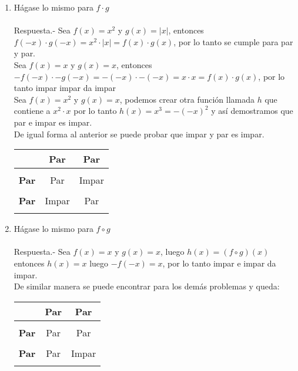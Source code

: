 \begin{enumerate}
\begin{enumerate}[\bfseries (a)]
	    \item Hágase lo mismo para $f\cdot g$\\\\
	    Respuesta.-\; Sea $f(x)=x^2$ \; y \; $g(x)=|x|$, entonces $f(-x) \cdot g(-x) = x^2 \cdot |x| = f(x) \cdot g(x)$, por lo tanto se cumple para par y par.\\
	    Sea $f(x)=x$ \; y \; $g(x)=x$, entonces $-f(-x) \cdot -g(-x) = -(-x) \cdot -(-x) = x \cdot x = f(x) \cdot g(x)$, por lo tanto impar impar da impar\\
	    Sea $f(x)=x^2$ \; y \; $g(x)=x$, podemos crear otra función llamada $h$ que contiene a $x^2 \cdot x$ por lo tanto $h(x)=x^3 = -(-x)^2$ y así demostramos que par e impar es impar.\\
	    De igual forma al anterior se puede probar que impar y par es impar.
	    \begin{center}
		\begin{tabular}{c|cc}
		    &\textbf{Par}&\textbf{Par}\\
		    \hline\\
		    \textbf{Par}&Par&Impar\\\\
		    \textbf{Par}&Impar&Par\\\\
		\end{tabular}
	    \end{center}
	    \vspace{1cm}

	    \item Hágase lo mismo para $f\circ g$\\\\
	    Respuesta.-\; Sea $f(x)=x$ \; y \; $g(x)=x$, luego $h(x)=(f \circ g)(x)$ entonces $h(x) = x$ luego $-f(-x) = x$, por lo tanto impar e impar da impar.\\
	    De similar manera se puede encontrar para los demás problemas y queda:
	    \begin{center}
		\begin{tabular}{c|cc}
		    &\textbf{Par}&\textbf{Par}\\
		    \hline\\
		    \textbf{Par}&Par&Par\\\\
		    \textbf{Par}&Par&Impar\\\\
		\end{tabular}
	    \end{center}
	    \vspace{1cm}


\end{enumerate}
\end{enumerate}
